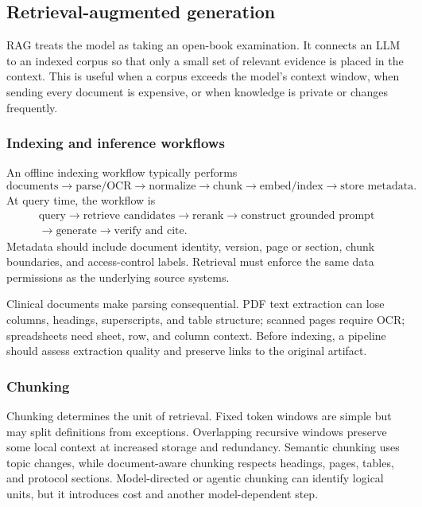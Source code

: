 \documentclass[12pt,oneside]{book}
\numberwithin{equation}{section}
\theoremstyle{definition}
\theoremstyle{plain}
\theoremstyle{remark}
\begin{document}
\subsection{Retrieval-augmented generation}

RAG treats the model as taking an open-book examination.  It connects an LLM to
an indexed corpus so that only a small set of relevant evidence is placed in
the context.  This is useful when a corpus exceeds the model's context window,
when sending every document is expensive, or when knowledge is private or
changes frequently.

\subsubsection{Indexing and inference workflows}

An offline indexing workflow typically performs
\[
 \text{documents}\rightarrow\text{parse/OCR}\rightarrow\text{normalize}
 \rightarrow\text{chunk}\rightarrow\text{embed/index}\rightarrow
 \text{store metadata}.
\]
At query time, the workflow is
\[
\begin{gathered}
 \text{query}\rightarrow\text{retrieve candidates}\rightarrow\text{rerank}
 \rightarrow\text{construct grounded prompt}\\
 \longrightarrow\text{generate}\rightarrow\text{verify and cite}.
\end{gathered}
\]
Metadata should include document identity, version, page or section, chunk
boundaries, and access-control labels.  Retrieval must enforce the same data
permissions as the underlying source systems.

Clinical documents make parsing consequential.  PDF text extraction can lose
columns, headings, superscripts, and table structure; scanned pages require OCR;
spreadsheets need sheet, row, and column context.  Before indexing, a pipeline
should assess extraction quality and preserve links to the original artifact.

\subsubsection{Chunking}

Chunking determines the unit of retrieval.  Fixed token windows are simple but
may split definitions from exceptions.  Overlapping recursive windows preserve
some local context at increased storage and redundancy.  Semantic chunking
uses topic changes, while document-aware chunking respects headings, pages,
tables, and protocol sections.  Model-directed or agentic chunking can identify
logical units, but it introduces cost and another model-dependent step.
\end{document}
